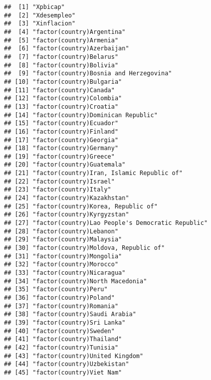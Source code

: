 \documentclass[
]{article}
\begin{document}
\begin{verbatim}
##  [1] "Xpbicap"                                        
##  [2] "Xdesempleo"                                     
##  [3] "Xinflacion"                                     
##  [4] "factor(country)Argentina"                       
##  [5] "factor(country)Armenia"                         
##  [6] "factor(country)Azerbaijan"                      
##  [7] "factor(country)Belarus"                         
##  [8] "factor(country)Bolivia"                         
##  [9] "factor(country)Bosnia and Herzegovina"          
## [10] "factor(country)Bulgaria"                        
## [11] "factor(country)Canada"                          
## [12] "factor(country)Colombia"                        
## [13] "factor(country)Croatia"                         
## [14] "factor(country)Dominican Republic"              
## [15] "factor(country)Ecuador"                         
## [16] "factor(country)Finland"                         
## [17] "factor(country)Georgia"                         
## [18] "factor(country)Germany"                         
## [19] "factor(country)Greece"                          
## [20] "factor(country)Guatemala"                       
## [21] "factor(country)Iran, Islamic Republic of"       
## [22] "factor(country)Israel"                          
## [23] "factor(country)Italy"                           
## [24] "factor(country)Kazakhstan"                      
## [25] "factor(country)Korea, Republic of"              
## [26] "factor(country)Kyrgyzstan"                      
## [27] "factor(country)Lao People's Democratic Republic"
## [28] "factor(country)Lebanon"                         
## [29] "factor(country)Malaysia"                        
## [30] "factor(country)Moldova, Republic of"            
## [31] "factor(country)Mongolia"                        
## [32] "factor(country)Morocco"                         
## [33] "factor(country)Nicaragua"                       
## [34] "factor(country)North Macedonia"                 
## [35] "factor(country)Peru"                            
## [36] "factor(country)Poland"                          
## [37] "factor(country)Romania"                         
## [38] "factor(country)Saudi Arabia"                    
## [39] "factor(country)Sri Lanka"                       
## [40] "factor(country)Sweden"                          
## [41] "factor(country)Thailand"                        
## [42] "factor(country)Tunisia"                         
## [43] "factor(country)United Kingdom"                  
## [44] "factor(country)Uzbekistan"                      
## [45] "factor(country)Viet Nam"
\end{verbatim}
\end{document}
